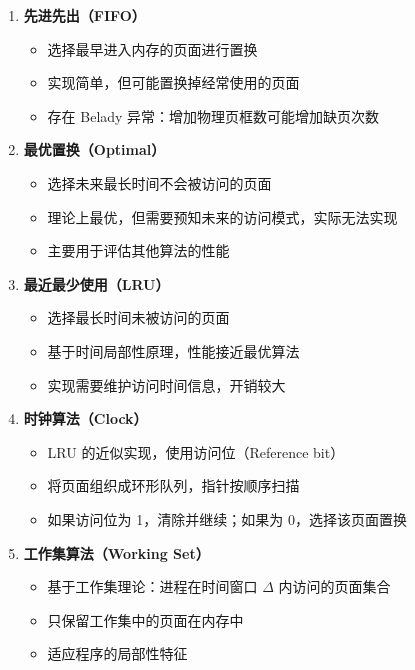 \begin{enumerate}
  \item \textbf{先进先出（FIFO）}
    \begin{itemize}
      \item 选择最早进入内存的页面进行置换
      \item 实现简单，但可能置换掉经常使用的页面
      \item 存在 Belady 异常：增加物理页框数可能增加缺页次数
    \end{itemize}

  \item \textbf{最优置换（Optimal）}
    \begin{itemize}
      \item 选择未来最长时间不会被访问的页面
      \item 理论上最优，但需要预知未来的访问模式，实际无法实现
      \item 主要用于评估其他算法的性能
    \end{itemize}

  \item \textbf{最近最少使用（LRU）}
    \begin{itemize}
      \item 选择最长时间未被访问的页面
      \item 基于时间局部性原理，性能接近最优算法
      \item 实现需要维护访问时间信息，开销较大
    \end{itemize}

  \item \textbf{时钟算法（Clock）}
    \begin{itemize}
      \item LRU 的近似实现，使用访问位（Reference bit）
      \item 将页面组织成环形队列，指针按顺序扫描
      \item 如果访问位为 1，清除并继续；如果为 0，选择该页面置换
    \end{itemize}

  \item \textbf{工作集算法（Working Set）}
    \begin{itemize}
      \item 基于工作集理论：进程在时间窗口 $\Delta$ 内访问的页面集合
      \item 只保留工作集中的页面在内存中
      \item 适应程序的局部性特征
    \end{itemize}
\end{enumerate}

